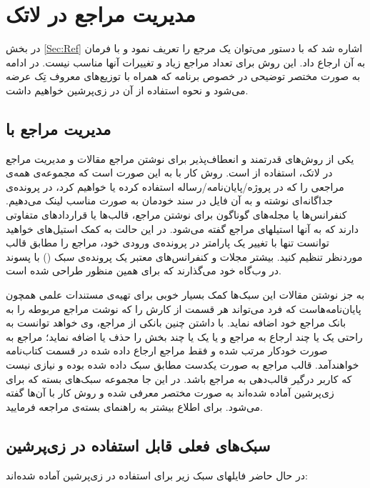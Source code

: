 \section{مدیریت مراجع در لاتک}\label{App:RefMan}
در بخش \ref{Sec:Ref} اشاره شد که با دستور 
  می‌توان یک مرجع را تعریف نمود و با فرمان
  به آن ارجاع داد. این روش برای تعداد مراجع زیاد و تغییرات آنها مناسب نیست. در ادامه به صورت مختصر توضیحی در خصوص برنامه  که همراه با توزیع‌های معروف تِک عرضه می‌شود و نحوه استفاده از آن در زی‌پرشین خواهیم داشت.

\subsection{ مدیریت مراجع با  \texorpdfstring{}{Bib\TeX} }
یکی از روش‌های قدرتمند و انعطاف‌پذیر برای نوشتن مراجع مقالات و مدیریت مراجع در لاتک، استفاده از   است.
 روش کار با   به این صورت است که مجموعه‌ی همه‌ی مراجعی را که در پروژه/پایان‌نامه/رساله استفاده کرده یا خواهیم کرد، 
در پرونده‌ی جداگانه‌ای نوشته و به آن فایل در سند خودمان به صورت مناسب لینک می‌دهیم.
 کنفرانس‌ها یا مجله‌های گوناگون برای نوشتن مراجع، قالب‌ها یا قراردادهای متفاوتی دارند که به آنها استیلهای مراجع گفته می‌شود.
 در این حالت به کمک ‌استیل‌های  خواهید توانست تنها با تغییر یک پارامتر در پرونده‌ی ورودی خود، مراجع را مطابق قالب موردنظر تنظیم کنید. 
 بیشتر مجلات و کنفرانس‌های معتبر یک پرونده‌ی سبک () با پسوند  در وب‌گاه خود می‌گذارند که برای همین منظور طراحی شده است.

به جز نوشتن مقالات این سبک‌ها کمک بسیار خوبی برای تهیه‌ی مستندات علمی همچون پایان‌نامه‌هاست که فرد می‌تواند هر قسمت از کارش را که نوشت مراجع مربوطه را به بانک مراجع خود اضافه نماید. با داشتن چنین بانکی از مراجع، وی خواهد توانست به راحتی یک یا چند ارجاع به مراجع و یا یک یا چند بخش را حذف یا اضافه ‌نماید؛ 
مراجع به صورت خودکار مرتب شده و فقط مراجع ارجاع داده شده در قسمت کتاب‌نامه خواهندآمد. قالب مراجع به صورت یکدست مطابق سبک داده شده بوده و نیازی نیست که کاربر درگیر قالب‌دهی به مراجع باشد. 
در این جا مجموعه‌ سبک‌های بسته  که برای  زی‌پرشین آماده شده‌اند به صورت مختصر معرفی شده و روش کار با آن‌ها گفته می‌شود. برای اطلاع بیشتر به راهنمای بسته‌ی  مراجعه فرمایید.
\subsection{سبک‌های فعلی قابل استفاده در زی‌پرشین}
در حال حاضر فایلهای سبک زیر برای استفاده در زی‌پرشین آماده شده‌اند:

